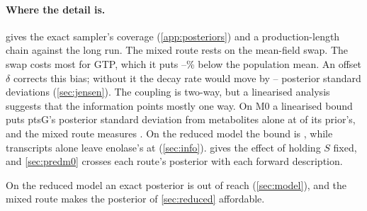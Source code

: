 \paragraph{Where the detail is.}  gives the exact sampler's coverage
(\cref{app:posteriors}) and a production-length chain against the long run. The mixed route
rests on the mean-field swap. The swap costs most for GTP, which it puts
--\% below the population mean. An offset $\delta$ corrects this
bias; without it the decay rate would move by -- posterior
standard deviations (\cref{sec:jensen}). The coupling is two-way, but a linearised analysis
suggests that the information points mostly one way. On M0 a linearised bound puts ptsG's
posterior standard deviation from metabolites alone at  of its prior's, and the
mixed route measures . On the reduced model the bound is , while
transcripts alone leave enolase's at  (\cref{sec:info}).  gives the effect of holding $S$ fixed, and
\cref{sec:predm0} crosses each route's posterior with each forward description.

On the reduced model an exact posterior is out of reach (\cref{sec:model}), and the mixed
route makes the posterior of \cref{sec:reduced} affordable.
